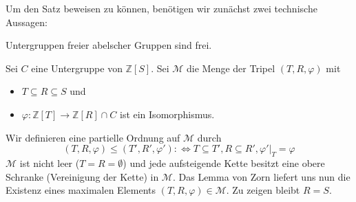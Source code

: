 \noindent Um den Satz beweisen zu können, benötigen wir zunächst zwei technische Aussagen:

\begin{lemma}[label=lem:untergrp_frei,{name=[Untergruppen freier abelscher Gruppen sind frei]}]
	Untergruppen freier abelscher Gruppen sind frei.
\end{lemma}
\begin{beweis}
	Sei $C$ eine Untergruppe von $\mathbb{Z}[S]$. Sei $\mathcal{M}$ die Menge der Tripel $(T,R,\varphi)$ mit
	\begin{itemize}[itemsep=0pt,topsep=1ex]
		\item $T \subseteq R \subseteq S$ und
		\item $\varphi \colon \mathbb{Z}[T] \to \mathbb{Z}[R] \cap C$ ist ein Isomorphismus.
	\end{itemize}
	Wir definieren eine partielle Ordnung auf $\mathcal{M}$ durch
	\[
		(T,R,\varphi) \le (T',R',\varphi') :\iff T \subseteq T', R \subseteq R', \varphi'|_{T}=\varphi
	\]
	$\mathcal{M}$ ist nicht leer ($T=R=\emptyset$) und jede aufsteigende Kette besitzt eine obere Schranke (Vereinigung der Kette) in $\mathcal{M}$.
	Das Lemma von Zorn liefert uns nun die Existenz eines maximalen Elements $(T,R,\varphi) \in \mathcal{M}$. Zu zeigen bleibt $R=S$. 
	

\end{beweis}
